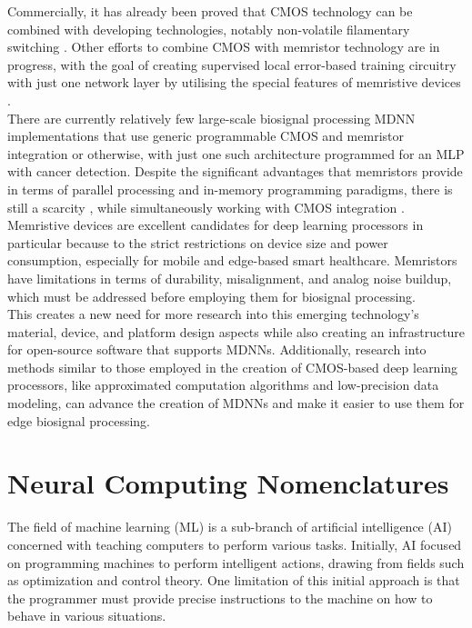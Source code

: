 \noindent Commercially, it has already been proved that CMOS technology can be combined with developing technologies, notably non-volatile filamentary switching \cite{hayakawa2015highly}. Other efforts to combine CMOS with memristor technology are in progress, with the goal of creating supervised local error-based training circuitry with just one network layer by utilising the special features of memristive devices \cite{payvand2020analog}. \\

\noindent There are currently relatively few large-scale biosignal processing MDNN implementations that use generic programmable CMOS and memristor integration or otherwise, with just one such architecture programmed for an MLP with cancer detection. Despite the significant advantages that memristors provide in terms of parallel processing and in-memory programming paradigms, there is still a scarcity \cite{dalgaty2019hybrid}, while simultaneously working with CMOS integration \cite{chicca2020recipe}. \\

\noindent Memristive devices are excellent candidates for deep learning processors in particular because to the strict restrictions on device size and power consumption, especially for mobile and edge-based smart healthcare. Memristors have limitations in terms of durability, misalignment, and analog noise buildup, which must be addressed before employing them for biosignal processing. \\

\noindent This creates a new need for more research into this emerging technology's material, device, and platform design aspects while also creating an infrastructure for open-source software that supports MDNNs. Additionally, research into methods similar to those employed in the creation of CMOS-based deep learning processors, like approximated computation algorithms and low-precision data modeling, can advance the creation of MDNNs and make it easier to use them for edge biosignal processing.

\section[Neural Computing Nomenclatures]{Neural Computing Nomenclatures}

\noindent The field of machine learning (ML) is a sub-branch of artificial intelligence (AI) concerned with teaching computers to perform various tasks.   Initially, AI focused on programming machines to perform intelligent actions, drawing from fields such as optimization and control theory. One limitation of this initial approach is that the programmer must provide precise instructions to the machine on how to behave in various situations. \\

